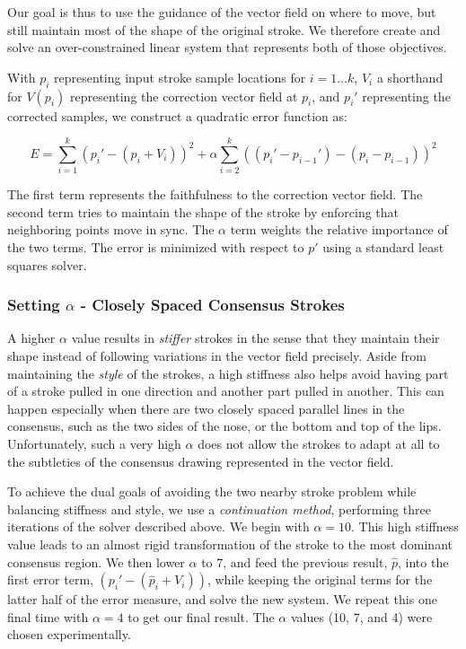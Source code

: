 Our goal is thus to use the guidance of the vector field on where to move, but still maintain most of the shape of the original stroke.  We therefore create and solve an over-constrained linear system that represents both of those objectives.

With $p_i$ representing input stroke sample locations for $i=1\ldots k$, $V_i$ a shorthand for $V(p_i)$ representing the correction vector field at $p_i$, and $p_i'$ representing the corrected samples, we construct a quadratic error function as:

\begin{equation}
E =  \sum_{i=1}^k (p_i' - (p_i + V_i))^2 +  \alpha \sum_{i=2}^k ((p_i' - p_{i-1}') - (p_i - p_{i-1}))^2
\end{equation}

The first term represents the faithfulness to the correction vector field. The second term tries to maintain the shape of the stroke by enforcing that neighboring points move in sync. The $\alpha$ term weights the relative importance of the two terms. The error is minimized with respect to $p'$ using a standard least squares solver.



\subsubsection{Setting $\alpha$ - Closely Spaced Consensus Strokes}

A higher $\alpha$ value results in {\em stiffer} strokes in the sense that they maintain their shape instead of following variations in the vector field precisely. Aside from maintaining the {\em style} of the strokes, a high stiffness also helps avoid having part of a stroke pulled in one direction and another part pulled in another. This can happen especially when there are two closely spaced parallel lines in the consensus, such as the two sides of the nose, or the bottom and top of the lips. Unfortunately, such a very high $\alpha$ does not allow the strokes to adapt at all to the subtleties of the consensus drawing represented in the vector field.

To achieve the dual goals of avoiding the two nearby stroke problem while balancing stiffness and style, we use a {\em continuation method}, performing three iterations of the solver described above. We begin with $\alpha=10$. This high stiffness value leads to an almost rigid transformation of the stroke to the most dominant consensus region. We then lower $\alpha$ to 7, and feed the previous result, $\hat{p}$, into the first error term, $(p_i' - (\hat{p}_i + V_i))$, while keeping the original terms for the latter half of the error measure, and solve the new system. We repeat this one final time with $\alpha=4$ to get our final result. The $\alpha$ values (10, 7, and 4) were chosen experimentally.


